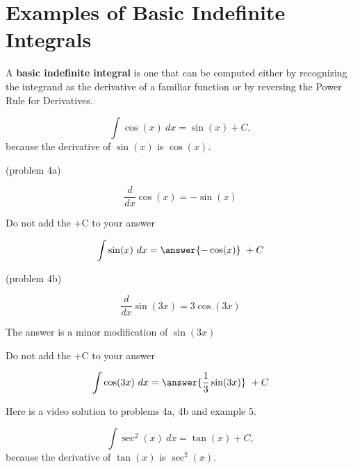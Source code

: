 \documentclass[handout]{ximera}
\begin{document}
\section{Examples of Basic Indefinite Integrals}

A \textbf{basic indefinite integral} is one that can be computed either by recognizing the integrand as the 
derivative of a familiar function or by reversing the Power Rule for Derivatives.



\begin{example}[example 4]
\[
\int \cos(x) \ dx = \sin(x) + C,
\]
because the derivative of $\sin(x)$ is $\cos(x)$.

\end{example}

\begin{problem}(problem 4a)

\begin{hint}
\[
\frac{d}{dx} \cos(x) = -\sin(x)
\]
\end{hint}
\begin{hint}
\begin{center}
Do not add the +C to your answer
\end{center}
\end{hint}

\[
\int \sin(x) \ dx =
\answer{-\cos(x)} \ + C
\]
\end{problem}

\begin{problem}(problem 4b)

\begin{hint}
\[
\frac{d}{dx} \sin(3x) = 3\cos(3x)
\]
\end{hint}
\begin{hint}
The answer is a minor modification of $\sin(3x)$
\end{hint}
\begin{hint}
\begin{center}
Do not add the +C to your answer
\end{center}
\end{hint}

\[
\int \cos(3x) \ dx =
\answer{\frac13 \sin(3x)} \ + C
\]
\end{problem}

Here is a video solution to problems 4a, 4b and example 5.
\begin{foldable}
\end{foldable}

\begin{example}[example 5]
\[
\int \sec^2(x) \ dx = \tan(x) + C,
\]
because the derivative of $\tan(x)$ is $\sec^2(x)$.

\end{example}
\end{document}

